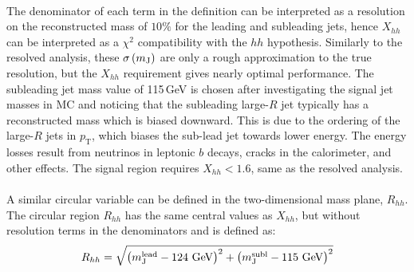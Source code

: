 \paragraph{}
The denominator of each term in the definition can be interpreted as a resolution on the reconstructed mass of $10\%$ for the leading and subleading jets, hence $X_{hh}$ can be interpreted as a $\chi^2$ compatibility with the $hh$ hypothesis. Similarly to the resolved analysis, these $\sigma \left(m_{\rm J}\right)$ are only a rough approximation to the true resolution, but the $X_{hh}$ requirement gives nearly optimal performance. The subleading jet mass value of 115\,GeV  is chosen after investigating the signal jet masses in MC and noticing that the subleading large-$R$ jet typically has a reconstructed mass which is biased downward. This is due to the ordering of the large-$R$ jets in $p_\text{T}$, which biases the sub-lead jet towards lower energy. The energy losses result from neutrinos in leptonic $b$ decays, cracks in the calorimeter, and other effects. The signal region requires $X_{hh} < 1.6$, same as the resolved analysis. 


\paragraph{}
A similar circular variable can be defined in the two-dimensional mass plane, $R_{hh}$. The circular region $R_{hh}$ has the same central values as $X_{hh}$, but without resolution terms in the denominators and is defined as:
\begin{equation}
\label{eq:boosted_RhhDef}
R_{hh} = \sqrt{\left(m^{\rm lead}_{\rm J} - \text{124 GeV}\right)^2 + \left(m^{\rm subl}_{\rm J} - \text{115 GeV}\right)^2} \\
\end{equation}

